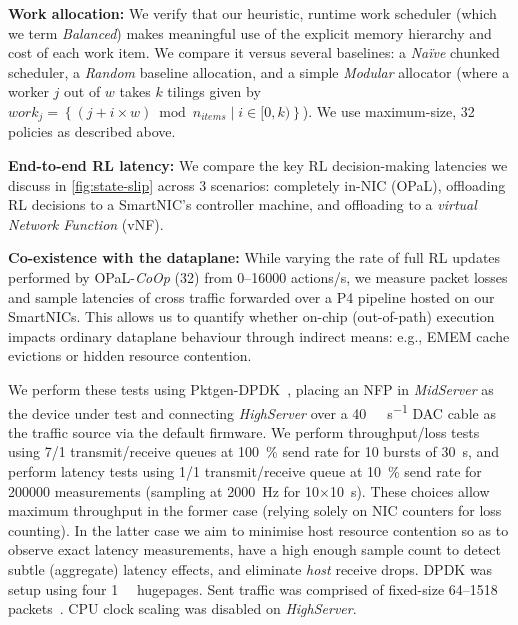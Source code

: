 \documentclass[sigconf,natbib=false]{acmart}
\newcommand{\fakepara}[1]{\noindent\textbf{#1:}}
\newcommand{\approachshort}{OPaL}
\newcommand{\Coopfw}{\emph{CoOp}}
\begin{document}
\fakepara{Work allocation}
We verify that our heuristic, runtime work scheduler (which we term \emph{Balanced}) makes meaningful use of the explicit memory hierarchy and cost of each work item.
We compare it versus several baselines: a \emph{Na\"{i}ve} chunked scheduler, a \emph{Random} baseline allocation, and a simple \emph{Modular} allocator (where a worker $j$ out of $w$ takes $k$ tilings given by $\mathit{work}_j=\left\{\left(j + i \times w\right) \bmod n_{\mathit{items}} \mid i \in [0,k) \right\}$).
We use maximum-size, \SI{32}{\bit} policies as described above.

\fakepara{End-to-end RL latency}
We compare the key RL decision-making latencies we discuss in \cref{fig:state-slip} across 3 scenarios: completely in-NIC (\approachshort{}), offloading RL decisions to a SmartNIC's controller machine, and offloading to a \emph{virtual Network Function} (vNF).

\fakepara{Co-existence with the dataplane}
While varying the rate of full RL updates performed by \approachshort{}-\Coopfw{} (\SI{32}{\bit}) from \numrange{0}{16000} actions/s, we measure packet losses and sample latencies of cross traffic forwarded over a P4 pipeline hosted on our SmartNICs.
This allows us to quantify whether on-chip (out-of-path) execution impacts ordinary dataplane behaviour through indirect means: e.g., EMEM cache evictions or hidden resource contention.

We perform these tests using Pktgen-DPDK~\cite{pktgen-dpdk}, placing an NFP in \emph{MidServer} as the device under test and connecting \emph{HighServer} over a \SI{40}{\giga\bit\per\second} DAC cable as the traffic source via the default firmware.
We perform throughput/loss tests using \num{7}/\num{1} transmit/receive queues at \SI{100}{\percent} send rate for 10 bursts of \SI{30}{\second}, and perform latency tests using \num{1}/\num{1} transmit/receive queue at \SI{10}{\percent} send rate for \num{200000} measurements (sampling at \SI{2000}{\hertz} for \num{10}$\times$\SI{10}{\second}).
These choices allow maximum throughput in the former case (relying solely on NIC counters for loss counting).
In the latter case we aim to minimise host resource contention so as to observe exact latency measurements, have a high enough sample count to detect subtle (aggregate) latency effects, and eliminate \emph{host} receive drops.
DPDK was setup using four \SI{1}{\gibi\byte} hugepages.
Sent traffic was comprised of fixed-size \SIrange{64}{1518}{\byte} packets~\cite{rfc2544}.
CPU clock scaling was disabled on \emph{HighServer}.
\end{document}
